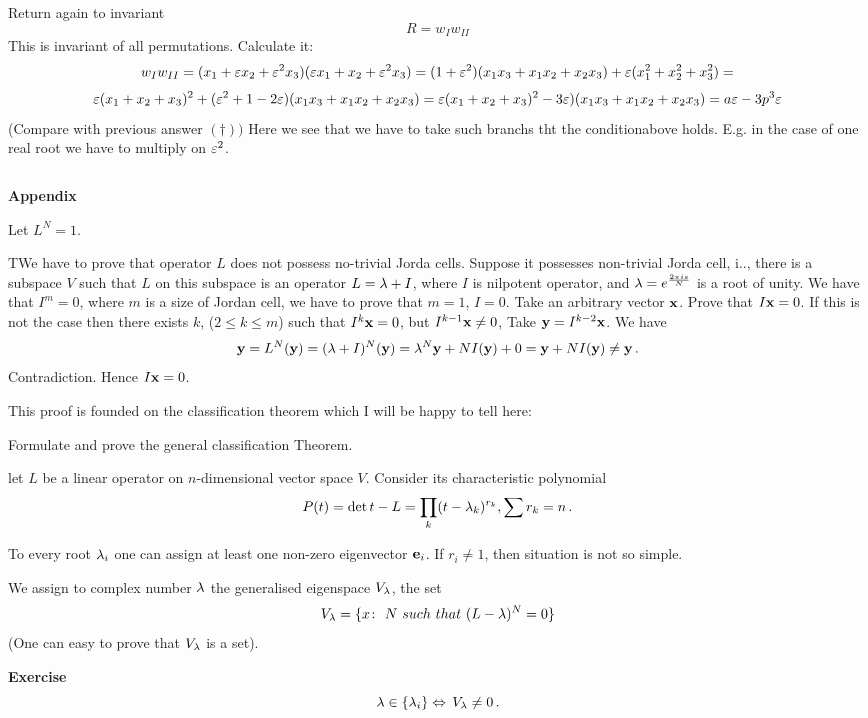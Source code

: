 Return again to invariant 
      $$
R=w_Iw_{II}
      $$
This is invariant of all permutations. Calculate it:
         $$
   w_Iw_{II}=(x_1+\varepsilon x_2+\varepsilon^2 x_3)(\varepsilon x_1+ x_2+\varepsilon^2 x_3)=
      (1+\varepsilon^2)(x_1x_3+x_1x_2+x_2x_3)+\varepsilon(x_1^2+x_2^2+x_3^2)=
           $$
           $$
\varepsilon(x_1+x_2+x_3)^2+(\varepsilon^2+1-2\varepsilon)(x_1x_3+x_1x_2+x_2x_3)=
\varepsilon(x_1+x_2+x_3)^2-3\varepsilon)(x_1x_3+x_1x_2+x_2x_3)=a\varepsilon-3p^3\varepsilon
         $$
(Compare with previous answer $(\dagger))$
Here we see that we have to take such branchs tht
the conditionabove holds.
E.g. in the case of one real root we have to multiply on $\varepsilon^2$.



$$ $$

{\bf Appendix}

Let $L^N=1$.

TWe have to prove that operator $L$ does not possess
no-trivial Jorda cells.
Suppose it possesses non-trivial Jorda cell, i.., 
there is a subspace $V$ such that $L$ on this subspace
is an operator $L=\lambda+I$, where $I$ is nilpotent operator,
and $\lambda=e^{2\pi i s\over N}$ is a root of unity. 
We have that $I^m=0$, where
$m$ is a size of Jordan cell, we have to prove that
$m=1$, $I=0$. Take an arbitrary vector ${\bf x}$. Prove
that $I{\bf x}=0$. If this is not the case then there exists 
$k$, ($2\leq k\leq m$) such that $I^k{\bf x}=0$, but $I^{k-1}{\bf x}\not=0$,
   Take ${\bf y}=I^{k-2}{\bf x}$.  We have 
       $$
{\bf y}=L^N({\bf y})=(\lambda+I)^N({\bf y})=\lambda^N{\bf y}+NI({\bf y})+0={\bf y}+NI({\bf y})\not={\bf y}\,.
       $$
Contradiction. Hence $I{\bf x}=0$.

  This proof is founded on the classification theorem 
which I will be happy to tell here:



Formulate and prove the general classification Theorem.

 let $L$ be a linear operator on $n$-dimensional vector space $V$.
 Consider its characteristic polynomial
     $$
P(t)=\det{t-L}=\prod_k (t-\lambda_k)^{r_k}, \sum r_k=n\,.
     $$

To every root $\lambda_i$ one can assign at least one 
non-zero eigenvector ${\bf e}_i$. If $r_i\not=1$, then
situation is not so simple.

We assign to complex number $\lambda$ the generalised eigenspace $V_\lambda$, the set
     $$
     V_\lambda=\{x\colon \,\,  N \,\, {such\,\, that}\,\, (L-\lambda )^N=0\}
     $$
(One can easy to prove that $V_\lambda$ is a set). 

{\bf Exercise}
          $$
\lambda\in \{\lambda_i\} \Leftrightarrow \, V_\lambda\not=0\,.
          $$


